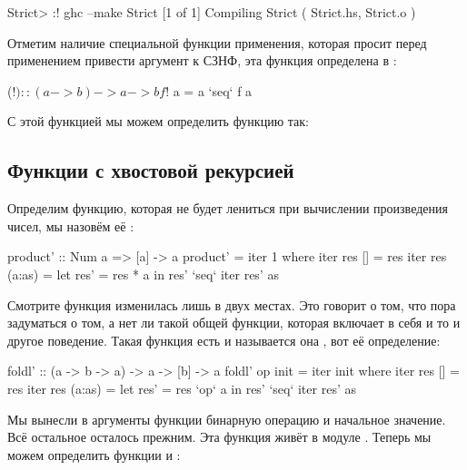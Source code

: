\begin{code}
Strict> :! ghc --make Strict
[1 of 1] Compiling Strict           ( Strict.hs, Strict.o )
\end{code}

Отметим наличие специальной функции применения, которая просит перед
применением привести аргумент к СЗНФ, эта функция определена в
:


\begin{code}
($!) :: (a -> b) -> a -> b
 f $! a = a `seq` f a
\end{code}

С этой функцией мы можем определить функцию  так:



\subsection{Функции с хвостовой рекурсией}

Определим функцию, которая не будет лениться при вычислении произведения
чисел, мы назовём её :


\begin{code}
product' :: Num a => [a] -> a
product' = iter 1
    where iter res []        = res
          iter res (a:as)    = let res' = res * a
                               in  res' `seq` iter res' as 
\end{code}

Смотрите функция  изменилась лишь в двух местах. Это говорит о
том, что пора задуматься о том, а нет ли такой общей функции, которая
включает в себя и то и другое поведение. Такая функция есть и называется
она , вот её определение:


\begin{code}
foldl' :: (a -> b -> a) -> a -> [b] -> a
foldl' op init = iter init
    where iter res []        = res
          iter res (a:as)    = let res' = res `op` a
                               in  res' `seq` iter res' as 
\end{code}

Мы вынесли в аргументы функции бинарную операцию и начальное значение.
Всё остальное осталось прежним. Эта функция живёт в модуле
. Теперь мы можем определить функции  и
:


